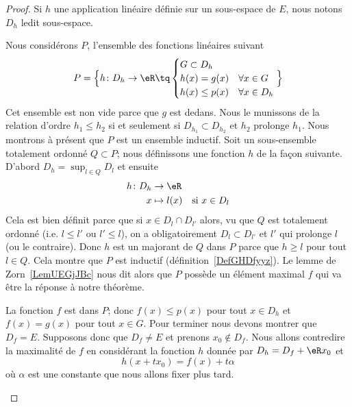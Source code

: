 \begin{proof}
    Si \( h\) une application linéaire définie sur un sous-espace de \( E\), nous notons \( D_h\) ledit sous-espace.

    \begin{subproof}

        Nous considérons \( P\), l'ensemble des fonctions linéaires suivant
        \begin{equation}
            P=\Big\{  h\colon D_h\to \eR\tq
            \begin{cases}
                G\subset D_h                     \\
                h(x)=g(x)     & \forall x\in G   \\
                h(x)\leq p(x) & \forall x\in D_h
            \end{cases}
            \Big\}
        \end{equation}
        Cet ensemble est non vide parce que \( g\) est dedans. Nous le munissons de la relation d'ordre \( h_1\leq h_2\) si et seulement si \( D_{h_1}\subset D_{h_2}\) et \( h_2\) prolonge \( h_1\). Nous montrons à présent que \( P\) est un ensemble inductif. Soit un sous-ensemble totalement ordonné \( Q\subset P\); nous définissons une fonction \( h\) de la façon suivante. D'abord \( D_h=\sup_{l\in Q}D_l\) et ensuite
        \begin{equation}
            \begin{aligned}
                h\colon D_h & \to \eR                            \\
                x           & \mapsto l(x) & \text{si } x\in D_l
            \end{aligned}
        \end{equation}
        Cela est bien définit parce que si \( x\in D_l\cap D_{l'}\) alors, vu que \( Q\) est totalement ordonné (i.e. \( l\leq l'\) ou \( l'\leq l\)), on a obligatoirement \( D_l\subset D_{l'}\) et \( l'\) qui prolonge \( l\) (ou le contraire). Donc \( h\) est un majorant de \( Q\) dans \( P\) parce que \( h\geq l\) pour tout \( l\in Q\). Cela montre que \( P\) est inductif (définition~\ref{DefGHDfyyz}). Le lemme de Zorn~\ref{LemUEGjJBc} nous dit alors que \( P\) possède un élément maximal \( f\) qui va être la réponse à notre théorème.

        \spitem[Le support de \( f\)]

        La fonction \( f\) est dans \( P\); donc \( f(x)\leq p(x)\) pour tout \( x\in D_h\) et \( f(x)=g(x)\) pour tout \( x\in G\). Pour terminer nous devons montrer que \( D_f=E\). Supposons donc que \( D_f\neq E\) et prenons \( x_0\notin D_f\). Nous allons contredire la maximalité de \( f\) en considérant la fonction \( h\) donnée par \( D_h=D_f+\eR x_0 \) et
        \begin{equation}
            h(x+tx_0)=f(x)+t\alpha
        \end{equation}
        où \( \alpha\) est une constante que nous allons fixer plus tard.


\end{subproof}
\end{proof}
